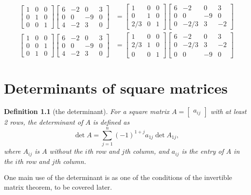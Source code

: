 \documentclass[draft,12pt]{report}
\newtheorem{definition}{Definition}
\begin{document}
\begin{align*}
    \begin{bmatrix}
        1 & 0 & 0 \\
        0 & 1 & 0 \\
        0 & 0 & 1
    \end{bmatrix} \begin{bmatrix}
        6 & -2 & 0 & 3 \\
        0 & 0 & -9 & 0 \\
        4 & -2 & 3 & 0
    \end{bmatrix} &= \begin{bmatrix}
        1 & 0 & 0 \\
        0 & 1 & 0 \\
        2/3 & 0 & 1
    \end{bmatrix} \begin{bmatrix}
        6 & -2 & 0 & 3 \\
        0 & 0 & -9 & 0 \\
        0 & -2/3 & 3 & -2
    \end{bmatrix} \\
    \begin{bmatrix}
        1 & 0 & 0 \\
        0 & 0 & 1 \\
        0 & 1 & 0
    \end{bmatrix} \begin{bmatrix}
        6 & -2 & 0 & 3 \\
        0 & 0 & -9 & 0 \\
        4 & -2 & 3 & 0
    \end{bmatrix} &= \begin{bmatrix}
        1 & 0 & 0 \\
        2/3 & 1 & 0 \\
        0 & 0 & 1
    \end{bmatrix} \begin{bmatrix}
        6 & -2 & 0 & 3 \\
        0 & -2/3 & 3 & -2 \\
        0 & 0 & -9 & 0
    \end{bmatrix}
\end{align*}

\chapter{Determinants of square matrices}

\begin{definition}[the determinant]
    For a square matrix $A = \begin{bmatrix} a_{ij} \end{bmatrix}$ with at least 2 rows, the determinant of $A$ is defined as
    \begin{equation*}
        \det A = \sum_{j=1}^n (-1)^{1+j}a_{1j} \det A_{1j},
    \end{equation*}
    where $A_{ij}$ is $A$ without the $i$th row and $j$th column, and $a_{ij}$ is the entry of $A$ in the $i$th row and $j$th column.
\end{definition}
\noindent
One main use of the determinant is as one of the conditions of the invertible matrix theorem, to be covered later.
\end{document}
